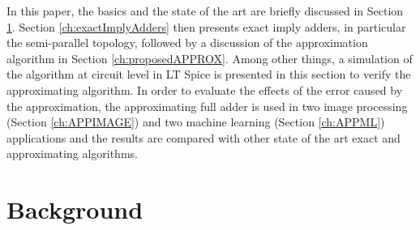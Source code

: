 \documentclass[]{IEEEtran}
\begin{document}
In this paper, the basics and the state of the art are briefly discussed in Section \ref{ch:background}. Section \ref{ch:exactImplyAdders} then presents exact \gls{imply} adders, in particular the semi-parallel topology, followed by a discussion of the approximation algorithm in Section \ref{ch:proposedAPPROX}. Among other things, a simulation of the algorithm at circuit level in LT Spice is presented in this section to verify the approximating algorithm.
In order to evaluate the effects of the error caused by the approximation, the approximating full adder is used in two image processing (Section \ref{ch:APPIMAGE}) and two machine learning (Section \ref{ch:APPML}) applications and the results are compared with other state of the art exact and approximating algorithms.

\section{Background}
\label{ch:background}
  
\end{document}
